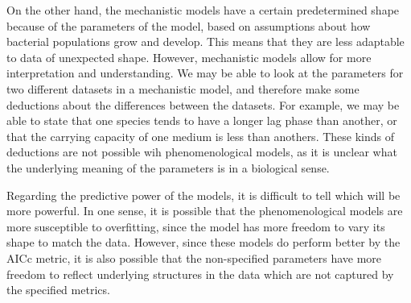 \documentclass[11pt,a4wide,titlepage]{article}
\begin{document}
On the other hand, the mechanistic models have a certain predetermined shape because of the parameters of the model, based on assumptions about how bacterial populations grow and develop. This means that they are less adaptable to data of unexpected shape. However, mechanistic models allow for more interpretation and understanding. We may be able to look at the parameters for two different datasets in a mechanistic model, and therefore make some deductions about the differences between the datasets. For example, we may be able to state that one species tends to have a longer lag phase than another, or that the carrying capacity of one medium is less than anothers. These kinds of deductions are not possible wih phenomenological models, as it is unclear what the underlying meaning of the parameters is in a biological sense. 

Regarding the predictive power of the models, it is difficult to tell which will be more powerful. In one sense, it is possible that the phenomenological models are more susceptible to overfitting, since the model has more freedom to vary its shape to match the data. However, since these models do perform better by the AICc metric, it is also possible that the non-specified parameters have more freedom to reflect underlying structures in the data which are not captured by the specified metrics.


\end{document}
